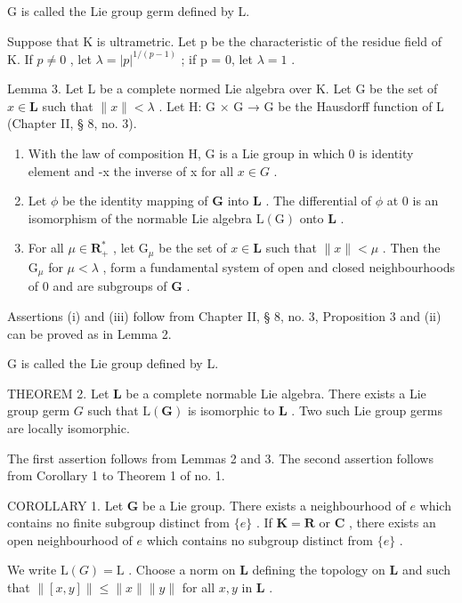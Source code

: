 G is called the Lie group germ defined by L.

Suppose that K is ultrametric. Let p be the characteristic of the residue field of K. If \(p \neq 0\) , let \(\lambda = |p|^{1/(p-1)}\) ; if p = 0, let \(\lambda = 1\) .

Lemma 3. Let L be a complete normed Lie algebra over K. Let G be the set of \(x \in \mathbf{L}\) such that \(\| x \| < \lambda\) . Let H: G × G → G be the Hausdorff function of L (Chapter II, § 8, no. 3).

\begin{enumerate}
\def\labelenumi{(\roman{enumi})}
\item
  With the law of composition H, G is a Lie group in which 0 is identity element and -x the inverse of x for all \(x \in G\) .
\item
  Let \(\phi\) be the identity mapping of \(\mathbf{G}\) into \(\mathbf{L}\) . The differential of \(\phi\) at 0 is an isomorphism of the normable Lie algebra \(\mathrm{L}(\mathrm{G})\) onto \(\mathbf{L}\) .
\item
  For all \(\mu \in \mathbf{R}_+^*\) , let \(\mathrm{G}_{\mu}\) be the set of \(x \in \mathbf{L}\) such that \(\| x \| < \mu\) . Then the \(\mathrm{G}_{\mu}\) for \(\mu < \lambda\) , form a fundamental system of open and closed neighbourhoods of 0 and are subgroups of \(\mathbf{G}\) .
\end{enumerate}

Assertions (i) and (iii) follow from Chapter II, § 8, no. 3, Proposition 3 and (ii) can be proved as in Lemma 2.

G is called the Lie group defined by L.

THEOREM 2. Let \(\mathbf{L}\) be a complete normable Lie algebra. There exists a Lie group germ \(G\) such that \(\mathrm{L}(\mathbf{G})\) is isomorphic to \(\mathbf{L}\) . Two such Lie group germs are locally isomorphic.

The first assertion follows from Lemmas 2 and 3. The second assertion follows from Corollary 1 to Theorem 1 of no. 1.

COROLLARY 1. Let \(\mathbf{G}\) be a Lie group. There exists a neighbourhood of \(e\) which contains no finite subgroup distinct from \(\{e\}\) . If \(\mathbf{K} = \mathbf{R}\) or \(\mathbf{C}\) , there exists an open neighbourhood of \(e\) which contains no subgroup distinct from \(\{e\}\) .

We write \(\mathrm{L}(G) = \mathrm{L}\) . Choose a norm on \(\mathbf{L}\) defining the topology on \(\mathbf{L}\) and such that \(\| [x,y]\| \leqslant \| x\| \| y\|\) for all \(x,y\) in \(\mathbf{L}\) .

